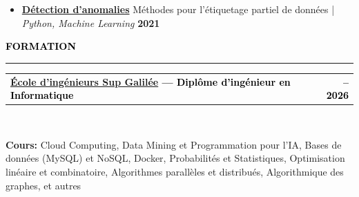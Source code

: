 \documentclass[10pt,english,french]{article}
\makeatletter
\newcommand{\educationIcon}[1][black]{\textcolor{#1}{\faGraduationCap}}
\newlength{\mpwidth}
\newcommand{\cvsection}[1]{
    \vspace{4pt}
    \textbf{\fontsize{9pt}{10pt}\selectfont \textcolor{black}{#1}}
    \vspace{6pt}
    \hrule
    \vspace{6pt}
}
\newcommand{\cvtextnotab}[1]{
    \parbox{1\mpwidth}{#1}
}
\newcommand{\cvevent}[2]{
    \vspace{2pt}
    \parbox{\mpwidth}{
        \begin{tabular*}{1\mpwidth}{@{\extracolsep{\fill}} l r}
            \textcolor{black}{\textbf{\fontsize{11}{12}\selectfont #1}} & \textcolor{black}{\textbf{\fontsize{12}{12}\selectfont #2}} \\
        \end{tabular*}\\[-8pt] %
    }
}
\newcommand{\cvsubevent}[2]{
    \parbox{\mpwidth}{
        \begin{tabular*}{1\mpwidth}{@{\extracolsep{\fill}} l r}
            \textcolor{black}{\textit{\fontsize{10}{12}\selectfont #1}} & \textcolor{black}{\textit{\fontsize{10}{12}\selectfont #2}} \\
        \end{tabular*}\\[-8pt] %
    }
    \vspace{-10pt}
}
\makeatother
\begin{document}
\begin{itemize}[leftmargin=0.5cm, label=\textbullet, itemsep=0.2em]
    \item \href{https://github.com/DmytroPalahin/Anomaly_Detection}{\textbf{Détection d'anomalies}} Méthodes pour l'étiquetage partiel de données | \textit{Python, Machine Learning} \hfill \textbf{2021}


\end{itemize}

\vspace{-5pt}
\cvsection{\educationIcon[black]\hspace{4pt}FORMATION}

\vspace{-3pt}
\cvevent{\href{https://www.sup-galilee.univ-paris13.fr/}{École d'ingénieurs Sup Galilée} --- Diplôme d'ingénieur en Informatique}{\fontsize{11pt}{11pt}\selectfont 2023\hspace{5pt}--\hspace{5pt}2026}

\vspace{-3pt}
\cvtextnotab{\textbf{Cours\!:} Cloud Computing, Data Mining et Programmation pour l'IA, Bases de données (MySQL) et NoSQL, Docker, Probabilités et Statistiques, Optimisation linéaire et combinatoire, Algorithmes parallèles et distribués, Algorithmique des graphes, et autres}

\vspace{-10pt}
\noindent{\textcolor{middle_light_gray}{\rule{\mpwidth}{0.2pt}}}
\vspace{-15pt}
\end{document}
